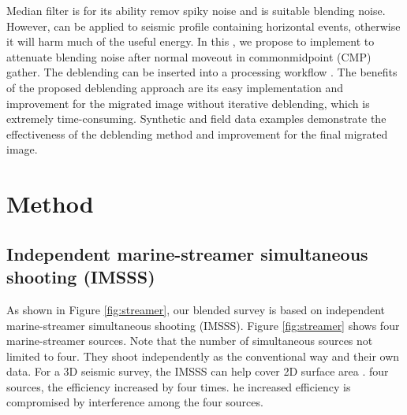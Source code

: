 Median filter  is  for its ability  remov spiky noise and  is  suitable  blending noise. However,  can  be applied  to seismic profile containing horizontal events, otherwise it will harm much of the useful energy. In this , we propose to implement  to attenuate blending noise after normal moveout in common\new{-}midpoint (CMP) gather. The deblending can be inserted into a  processing workflow . The benefits of the proposed deblending approach are its easy implementation and  improvement for the migrated image without  iterative deblending, which is extremely time-consuming. Synthetic and field data examples demonstrate the effectiveness of the deblending method and improvement for the final migrated image. 

\section{Method}
\subsection{Independent marine-streamer simultaneous shooting (IMSSS) }
As shown in Figure \ref{fig:streamer}, our blended survey is based on independent marine-streamer simultaneous shooting (IMSSS). Figure \ref{fig:streamer} shows four  marine-streamer sources. Note that the number of simultaneous sources  not  limited to four. They shoot independently as  the conventional way and  their own data. For a 3D seismic survey, the IMSSS can help  cover  2D surface area .  four sources, the efficiency  increased by four times. he  increased efficiency is compromised by  interference among the four sources. 


